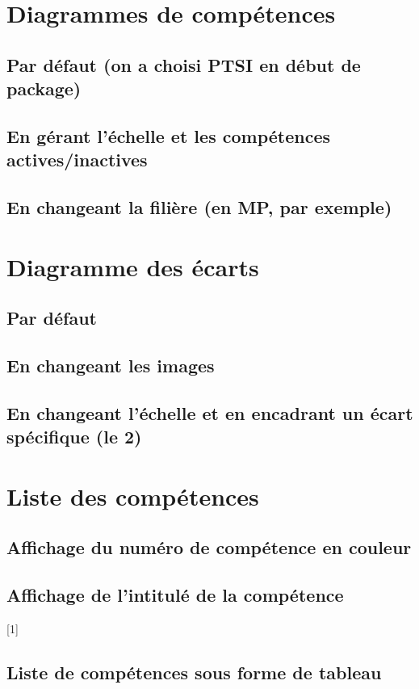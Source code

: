 \documentclass[11pt]{article}
\begin{document}
\section{Diagrammes de compétences}
\subsection{Par défaut (on a choisi PTSI en début de package)}
\UPSTIdiagrammeCompetences

\subsection{En gérant l'échelle et les compétences actives/inactives}
\UPSTIdiagrammeCompetences[0.7][][1][1][0][1][0]

\subsection{En changeant la filière (en MP, par exemple)}
\UPSTIdiagrammeCompetences[][3]


\section{Diagramme des écarts}

\subsection{Par défaut}
\UPSTIdiagrammeEcarts

\subsection{En changeant les images}

\subsection{En changeant l'échelle et en encadrant un écart spécifique (le 2)}
\UPSTIdiagrammeEcarts[0.8][0][1]

\section{Liste des compétences}
\subsection{Affichage du numéro de compétence en couleur}

\subsection{Affichage de l'intitulé de la compétence}
[1]

\subsection{Liste de compétences sous forme de tableau}
\vspace{1em}
\end{document}
